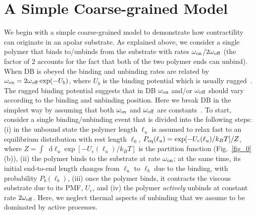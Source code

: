 \documentclass[twocolumn,prl,english]{revtex4-1}
\newcommand*\diff{\mathop{}\!\mathrm{d}}
\begin{document}
\section{A Simple Coarse-grained Model}
\label{s4a}
We begin with a simple coarse-grained model to demonstrate how contractility can originate in an apolar substrate. As explained above, we consider a single polymer that binds to/unbinds from the substrate with rates $\omega_{\rm on}$/$2\omega_{\rm off}$ (the factor of $2$ accounts for the fact that both of the two polymer ends can unbind). When DB is obeyed the binding and unbinding rates are related by $\omega_{\rm on} =2\omega_{\rm off}\exp(-U_b)$, where $U_b$ is the binding potential which is usually rugged~\cite{Nishizaka1995,Julicher1997}. The rugged binding potential suggests that in DB $\omega_{\rm on}$ and/or $\omega_{\rm off}$ should vary according to the binding and unbinding position. Here we break DB in the simplest way by assuming that both $\omega_{\rm on}$ and $\omega_{\rm off}$ are constants~\cite{Julicher1997}. To start, consider a single binding/unbinding event that is divided into the following steps:
(i) in the unbound state the polymer length $\ell_u$ is assumed to relax fast to an equilibrium distribution with rest length $\ell_0$, $P_{\rm eq}(\ell_u)=\exp[-U_e(\ell_u)/k_B T]/Z$, where  $Z=\int \diff \ell_u\exp[-U_e(\ell_u)/k_B T]$ is the partition function  (Fig.~\ref{fig_0}(b)), 
(ii) the polymer binds to the substrate at rate $\omega_{\rm on}$; at the same time, its initial end-to-end length changes from $\ell_u$ to $\ell_b$ due to the binding, with probability $P_b(\ell_b)$, 
(iii) once the polymer binds, it contracts the viscous substrate due to its PMF, $U_e$, 
and (iv) the polymer {\it actively} unbinds at constant rate $2\omega_{\rm off}$. 
Here, we neglect thermal aspects of unbinding that we assume to be dominated by active processes. 
\end{document}
